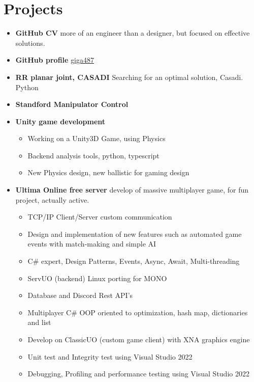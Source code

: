 \documentclass{article}
\begin{document}
\section{Projects}
\begin{itemize}
\item \textbf{GitHub CV}
more of an engineer than a designer, but focused on effective solutions. 

\item \textbf{GitHub profile}
\href{https://github.com/giga487}{giga487} 

\item \textbf{RR planar joint, CASADI}
Searching for an optimal solution, Casadi. Python 

\item \textbf{Standford Manipulator Control}
\item \textbf{Unity game development}\begin{itemize}
\item Working on a Unity3D Game, using Physics
\item Backend analysis tools, python, typescript
\item New Physics design, new ballistic for gaming design
\end{itemize}

\item \textbf{Ultima Online free server}
develop of massive multiplayer game, for fun project, actually active. 
\begin{itemize}
\item TCP/IP Client/Server custom communication
\item Design and implementation of new features such as automated game events with match-making and simple AI
\item C\# expert, Design Patterns, Events, Async, Await, Multi-threading
\item ServUO (backend) Linux porting for MONO
\item Database and Discord Rest API's
\item Multiplayer C\# OOP oriented to optimization, hash map, dictionaries and list
\item Develop on ClassicUO (custom game client) with XNA graphics engine
\item Unit test and Integrity test using Visual Studio 2022
\item Debugging, Profiling and performance testing using Visual Studio 2022
\end{itemize}

\end{itemize}
\end{document}
